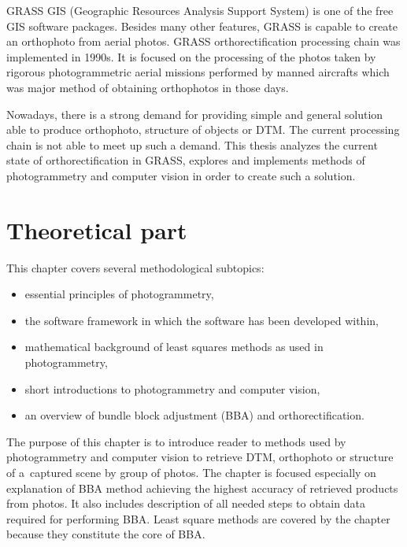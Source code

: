 \documentclass[a4paper,12pt]{article}
\begin{document}
GRASS GIS  (Geographic Resources Analysis Support System) \cite{neteler2012grass}
is one of the free GIS software packages. 
Besides many other features, GRASS is capable to create an orthophoto from aerial photos.
GRASS orthorectification processing chain was implemented in 1990s.
It is focused on the processing of the photos taken by rigorous 
photogrammetric aerial missions performed by manned aircrafts which was 
major method of obtaining orthophotos in those days. 

Nowadays, there is a strong demand for  providing simple and general solution 
 able to produce orthophoto, structure of objects or 
DTM. The current processing chain is not able to meet up such a demand.
 This thesis analyzes the current state of orthorectification in GRASS,
explores and implements methods of photogrammetry and computer vision in order 
to create such a solution.

\section{Theoretical part}

This chapter covers several methodological subtopics:
\begin{itemize}
\item essential principles of photogrammetry,
\item the software framework in which the software has been developed within, 
\item mathematical background of least squares methods as used in photogrammetry,
\item short introductions to photogrammetry and computer vision,
\item an overview of bundle block adjustment (BBA) and orthorectification.
\end{itemize} 

The purpose of this chapter is to introduce reader to methods used by photogrammetry and computer vision
to retrieve DTM, orthophoto or structure of a~captured scene by group of photos. 
The chapter is focused especially on 
explanation of BBA method achieving the highest accuracy of retrieved products from photos.  
It also includes description of all needed steps to obtain data required for performing BBA. 
Least square methods are covered by the chapter because they constitute the core of BBA.

\end{document}
